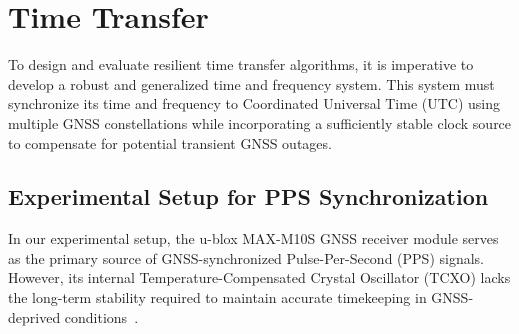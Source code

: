 \documentclass[12pt, a4paper]{extarticle}
\begin{document}
%
%
%
%
%


\pagebreak
\section{Time Transfer}\label{sec:time-transfer}

To design and evaluate resilient time transfer algorithms, it is imperative to
develop a robust and generalized time and frequency system. This system must
synchronize its time and frequency to Coordinated Universal Time (UTC) using
multiple GNSS constellations while incorporating a sufficiently stable clock
source to compensate for potential transient GNSS outages.

\subsection{Experimental Setup for PPS Synchronization}

In our experimental setup, the u-blox MAX-M10S GNSS receiver module serves as
the primary source of GNSS-synchronized Pulse-Per-Second (PPS) signals.
However, its internal Temperature-Compensated Crystal Oscillator (TCXO) lacks
the long-term stability required to maintain accurate timekeeping in
GNSS-deprived conditions~\cite{m10s-ds,m10s-im}.
\end{document}
